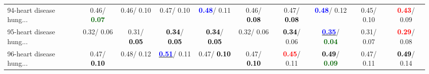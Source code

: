 \begin{table}[h]
\begin{center}
{\begin{tabular}{lc|c|c|c|c|c|c|c|c}
94-heart disease hung... &   0.46/\textcolor{darkgreen}{\textbf{  0.07}} &   0.46/  0.10 &   0.47/  0.10 & \textcolor{blue}{\textbf{  0.48}}/  0.11 &   0.46/\textcolor{black}{\textbf{  0.08}} &   0.47/\textcolor{black}{\textbf{  0.08}} & \textcolor{blue}{\textbf{  0.48}}/  0.12 &   0.45/  0.10 & \textcolor{red}{\textbf{  0.43}}/  0.09 \\
95-heart disease hung... &   0.32/  0.06 &   0.31/\textcolor{black}{\textbf{  0.05}} & \textcolor{black}{\textbf{  0.34}}/\textcolor{black}{\textbf{  0.05}} & \textcolor{black}{\textbf{  0.34}}/\textcolor{black}{\textbf{  0.05}} &   0.32/  0.06 & \textcolor{black}{\textbf{  0.34}}/  0.06 & \underline{\textcolor{blue}{\textbf{  0.35}}}/\textcolor{darkgreen}{\textbf{  0.04}} &   0.31/  0.07 & \textcolor{red}{\textbf{  0.29}}/  0.08 \\
96-heart disease hung... &   0.47/\textcolor{black}{\textbf{  0.10}} &   0.48/  0.12 & \underline{\textcolor{blue}{\textbf{  0.51}}}/  0.11 &   0.47/\textcolor{black}{\textbf{  0.10}} &   0.47/\textcolor{black}{\textbf{  0.10}} & \textcolor{red}{\textbf{  0.45}}/  0.11 & \textcolor{black}{\textbf{  0.49}}/\textcolor{darkgreen}{\textbf{  0.09}} &   0.47/  0.11 & \textcolor{black}{\textbf{  0.49}}/  0.14 \\\end{tabular}}\label{stratsALCKappa2AllReduxhalfa}
\end{center}
\end{table}
